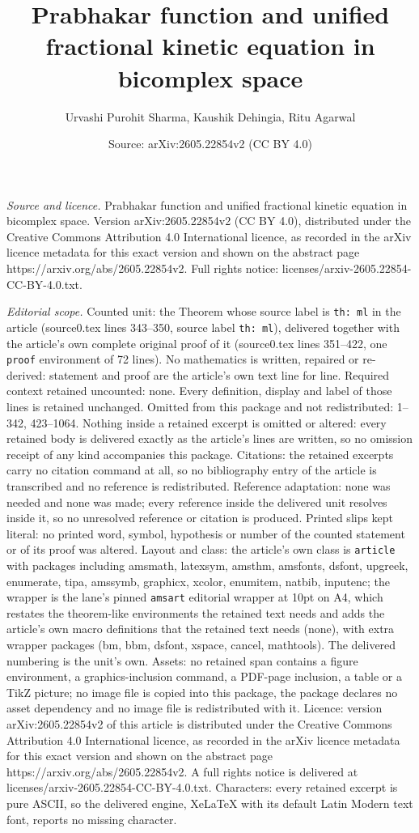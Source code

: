 \documentclass[10pt,a4paper]{amsart}
\title[Prabhakar function and unified fractional kinetic equation i]{Prabhakar function and unified fractional kinetic equation in bicomplex space}
\author{Urvashi Purohit Sharma, Kaushik Dehingia, Ritu Agarwal}
\date{Source: arXiv:2605.22854v2 (CC BY 4.0)}
\begin{document}
\maketitle

\noindent\emph{Source and licence.} Prabhakar function and unified fractional kinetic equation in bicomplex space. Version arXiv:2605.22854v2 (CC BY 4.0), distributed under the Creative Commons Attribution 4.0 International licence, as recorded in the arXiv licence metadata for this exact version and shown on the abstract page https://arxiv.org/abs/2605.22854v2. Full rights notice: licenses/arxiv-2605.22854-CC-BY-4.0.txt.\par\smallskip

\noindent\textit{Editorial scope.} Counted unit: the Theorem whose source label is \texttt{th: ml} in the article (source0.tex lines 343--350, source label \texttt{th: ml}), delivered together with the article's own complete original proof of it (source0.tex lines 351--422, one \texttt{proof} environment of 72 lines). No mathematics is written, repaired or re-derived: statement and proof are the article's own text line for line. Required context retained uncounted: none. Every definition, display and label of those lines is retained unchanged. Omitted from this package and not redistributed: 1--342, 423--1064. Nothing inside a retained excerpt is omitted or altered: every retained body is delivered exactly as the article's lines are written, so no omission receipt of any kind accompanies this package. Citations: the retained excerpts carry no citation command at all, so no bibliography entry of the article is transcribed and no reference is redistributed. Reference adaptation: none was needed and none was made; every reference inside the delivered unit resolves inside it, so no unresolved reference or citation is produced. Printed slips kept literal: no printed word, symbol, hypothesis or number of the counted statement or of its proof was altered. Layout and class: the article's own class is \texttt{article} with packages including amsmath, latexsym, amsthm, amsfonts, dsfont, upgreek, enumerate, tipa, amssymb, graphicx, xcolor, enumitem, natbib, inputenc; the wrapper is the lane's pinned \texttt{amsart} editorial wrapper at 10pt on A4, which restates the theorem-like environments the retained text needs and adds the article's own macro definitions that the retained text needs (none), with extra wrapper packages (bm, bbm, dsfont, xspace, cancel, mathtools). The delivered numbering is the unit's own. Assets: no retained span contains a figure environment, a graphics-inclusion command, a PDF-page inclusion, a table or a TikZ picture; no image file is copied into this package, the package declares no asset dependency and no image file is redistributed with it. Licence: version arXiv:2605.22854v2 of this article is distributed under the Creative Commons Attribution 4.0 International licence, as recorded in the arXiv licence metadata for this exact version and shown on the abstract page https://arxiv.org/abs/2605.22854v2. A full rights notice is delivered at licenses/arxiv-2605.22854-CC-BY-4.0.txt. Characters: every retained excerpt is pure ASCII, so the delivered engine, XeLaTeX with its default Latin Modern text font, reports no missing character.
\end{document}
